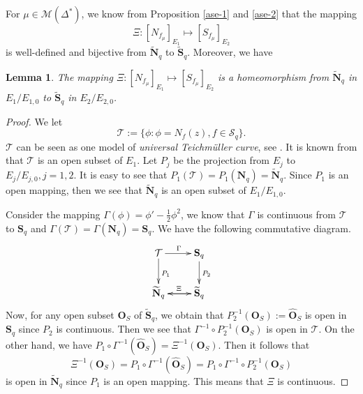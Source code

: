 \documentclass[11pt]{amsart}
\newtheorem{lemma}[theorem]{Lemma}
\theoremstyle{remark}
\theoremstyle{claim}
\theoremstyle{definition}
\theoremstyle{problem}
\theoremstyle{conjecture}
\theoremstyle{question}
\numberwithin{equation}{section}
\begin{document}
For $\mu \in \mathcal{M}(\Delta^{*})$, we know from Proposition \ref{ase-1} and \ref{ase-2} that the mapping
 $$\Xi: [N_{f_{\mu}}]_{E_1}  \mapsto   [S_{f_{\mu}}]_{E_2}$$
is well-defined and bijective from ${\widetilde{\mathbf{N}}_q}$ to
${\widetilde{\mathbf{S}}_q}$. Moreover, we have

\begin{lemma}\label{dengjia}
The mapping $\Xi: [N_{f_{\mu}}]_{E_1} \mapsto [S_{f_{\mu}}]_{E_2}$ is a homeomorphism from ${\widetilde{\mathbf{N}}_q}$ in $E_1/E_{1, 0}$ to
${\widetilde{\mathbf{S}}_q}$ in $E_2/E_{2, 0}$.
\end{lemma}

\begin{proof}
We let
 $$\mathcal{T}:=\{\phi: \phi=N_{f}(z), f\in \mathcal{S}_q\}.$$
$\mathcal{T}$ can be seen as one model of {\em universal Teichm\"uller curve}, see \cite{Bers, T}.  It is known from \cite{Zhur} that $\mathcal{T}$ is an open subset of $E_1$.  Let $P_{j}$ be the projection from $E_j$ to $E_j/E_{j,0},  j=1, 2$.  It is easy to see that $P_1(\mathcal{T})=P_1(\mathbf{N}_q)=\widetilde{\mathbf{N}}_q$.  Since $P_{1}$  is an open mapping, then we see that ${\widetilde{\mathbf{N}}_q}$ is an open subset of $E_1/E_{1, 0}$. 

Consider the mapping $\Gamma(\phi)=\phi'-\frac{1}{2}\phi^2$, we know that
$\Gamma$ is continuous from $\mathcal{T}$ to $\mathbf{S}_q$ and $\Gamma(\mathcal{T})=\Gamma(\mathbf{N}_q)=\mathbf{S}_q$.  We have the following commutative diagram.
\begin{displaymath}
    \xymatrix{
        \mathcal{T} \ar[r]^{\Gamma} \ar[d]^{P_1} & \mathbf{S}_q   \ar[d]^{P_2} \\
        \widetilde{\mathbf{N}}_q \ar[r]^{\Xi} & \widetilde{\mathbf{S}}_q  \ar[l]
    }
\end{displaymath}
Now, for any open subset $\mathbf{O}_S$ of $\widetilde{\mathbf{S}}_q$, we obtain that $P_2^{-1}(\mathbf{O}_S):=\widehat{\mathbf{O}}_S$ is open in  $\mathbf{S}_q$ since $P_2$ is continuous. Then we see that $\Gamma^{-1} \circ P_2^{-1}(\mathbf{O}_S)$ is open in $\mathcal{T}$. 
On the other hand, we have $P_1\circ \Gamma^{-1}(\widehat{\mathbf{O}}_S)=\Xi^{-1}(\mathbf{O}_S)$. Then it follows that
$$\Xi^{-1}(\mathbf{O}_S)=P_1\circ \Gamma^{-1}(\widehat{\mathbf{O}}_S)=P_1\circ \Gamma^{-1} \circ P_2^{-1}(\mathbf{O}_S)$$
is open in $\widetilde{\mathbf{N}}_q$ since $P_1$ is an open mapping.  This means that $\Xi$ is continuous. 


\end{proof}
\end{document}
